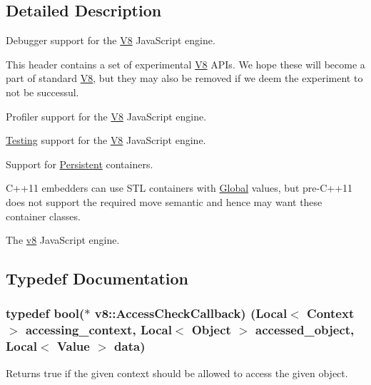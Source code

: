 \subsection{Detailed Description}
Debugger support for the \hyperlink{classv8_1_1V8}{V8} Java\+Script engine.

This header contains a set of experimental \hyperlink{classv8_1_1V8}{V8} A\+P\+Is. We hope these will become a part of standard \hyperlink{classv8_1_1V8}{V8}, but they may also be removed if we deem the experiment to not be successul.

Profiler support for the \hyperlink{classv8_1_1V8}{V8} Java\+Script engine.

\hyperlink{classv8_1_1Testing}{Testing} support for the \hyperlink{classv8_1_1V8}{V8} Java\+Script engine.

Support for \hyperlink{classv8_1_1Persistent}{Persistent} containers.

C++11 embedders can use S\+TL containers with \hyperlink{classv8_1_1Global}{Global} values, but pre-\/\+C++11 does not support the required move semantic and hence may want these container classes.

The \hyperlink{namespacev8}{v8} Java\+Script engine. 

\subsection{Typedef Documentation}
\subsubsection[{\texorpdfstring{Access\+Check\+Callback}{AccessCheckCallback}}]{\setlength{\rightskip}{0pt plus 5cm}typedef bool($\ast$ v8\+::\+Access\+Check\+Callback) ({\bf Local}$<$ {\bf Context} $>$ accessing\+\_\+context, {\bf Local}$<$ {\bf Object} $>$ accessed\+\_\+object, {\bf Local}$<$ {\bf Value} $>$ data)}\hypertarget{namespacev8_a1024fb358d107c1494163217830688e6}{}\label{namespacev8_a1024fb358d107c1494163217830688e6}
Returns true if the given context should be allowed to access the given object. 
